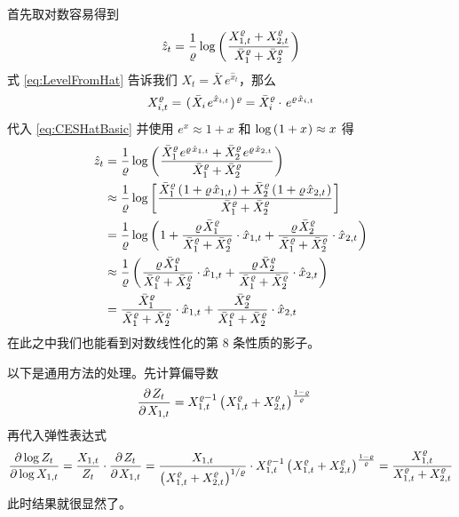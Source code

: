 首先取对数容易得到
\begin{equation}
    \hat z_t=\dfrac1\varrho\operatorname{log}\left(\mspace{1mu}\dfrac{X^\varrho_{1,t}+X^\varrho_{2,t}}{\bar X_1^\varrho+\bar X_2^\varrho}\mspace{1mu}\right)\label{eq:CESHatBasic}
\end{equation}
式 \ref{eq:LevelFromHat} 告诉我们 \(X_t=\bar X\,e^{\hat x_t}\)，那么
\begin{equation}
    X_{i,t}^\varrho=\qa{\bar X_i\,e^{\hat x_{i,t}}}^\varrho=\bar X_i^\varrho\cdot \,e^{\varrho\,\hat x_{i,t}}\label{eq:CESHatBasicX}
\end{equation}
代入 \ref{eq:CESHatBasic} 并使用 \(e^x\approx1+x\) 和 \(\operatorname{log}\left(\mspace{1mu}1+x\mspace{1mu}\right)\approx x\) 得
\begin{align}
    \hat z_t&=\dfrac1\varrho\log\bka{\dfrac{\bar X_1^\varrho\,e^{\varrho\,\hat x_{1,t}}+\bar X_2^\varrho\,e^{\varrho\,\hat x_{2,t}}}{\bar X_1^\varrho+\bar X_2^\varrho}}\notag\\
    &\approx\dfrac1\varrho\log\bks{\dfrac{\bar X_1^\varrho\bka{1+\varrho\,\hat x_{1,t}}+\bar X_2^\varrho\bka{1+\varrho\,\hat x_{2,t}}}{\bar X_1^\varrho+\bar X_2^\varrho}}\notag\\
    &=\dfrac1\varrho\log\bka{1+\dfrac{\varrho\,\bar X_1^\varrho}{\bar X_1^\varrho+\bar X_2^\varrho}\cdot\hat x_{1,t}+\dfrac{\varrho\,\bar X_2^\varrho}{\bar X_1^\varrho+\bar X_2^\varrho}\cdot\hat x_{2,t}}\notag\\
    &\approx\dfrac1\varrho\bka{\dfrac{\varrho\,\bar X_1^\varrho}{\bar X_1^\varrho+\bar X_2^\varrho}\cdot\hat x_{1,t}+\dfrac{\varrho\,\bar X_2^\varrho}{\bar X_1^\varrho+\bar X_2^\varrho}\cdot\hat x_{2,t}}\notag\\
    &=\dfrac{\bar X_1^\varrho}{\bar X_1^\varrho+\bar X_2^\varrho}\cdot\hat x_{1,t}+\dfrac{\bar X_2^\varrho}{\bar X_1^\varrho+\bar X_2^\varrho}\cdot\hat x_{2,t}\notag
\end{align}
在此之中我们也能看到对数线性化的第 8 条性质的影子。


以下是通用方法的处理。先计算偏导数
\begin{align}
    \dfrac{\partial\mspace{2mu} Z_t}{\partial\mspace{2mu} X_{1,t}}&=X_{1,t}^{\varrho-1}\left(\mspace{1mu} X_{1,t}^\varrho+X_{2,t}^\varrho\mspace{1mu}\right)^{\frac{1-\varrho}\varrho}\notag
\end{align}
再代入弹性表达式
\begin{equation}
    \dfrac{\partial\operatorname{log} Z_t}{\partial\operatorname{log} X_{1,t}}=\dfrac{X_{1,t}}{Z_t}\cdot\dfrac{\partial\mspace{2mu} Z_t}{\partial\mspace{2mu} X_{1,t}}=\dfrac{X_{1,t}}{\left(\mspace{1mu} X_{1,t}^\varrho+X_{2,t}^\varrho\mspace{1mu}\right)^{1/\varrho}}\cdot X_{1,t}^{\varrho-1}\left(\mspace{1mu} X_{1,t}^\varrho+X_{2,t}^\varrho\mspace{1mu}\right)^{\frac{1-\varrho}\varrho}=\dfrac{X_{1,t}^\varrho}{X_{1,t}^\varrho+X_{2,t}^\varrho}\notag
\end{equation}
此时结果就很显然了。

